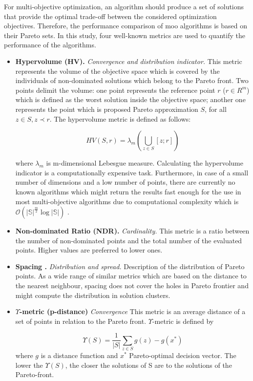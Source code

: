             For multi-objective optimization, an algorithm should produce a set of solutions that provide the optimal trade-off between the considered optimization objectives. Therefore, the performance comparison of \gls{moo} algorithms is based on their Pareto sets. In this study, four well-known metrics are used to quantify the performance of the algorithms.
            \begin{itemize}
                \item \textbf{Hypervolume (HV).}\cite{Zitzler2000ComparisonOM} \textit{Convergence and distribution indicator.}
                This metric represents the volume of the objective space which is covered by the individuals of non-dominated solutions which belong to the Pareto front. Two points delimit the volume: one point represents the reference point $r$ ($r \in R^m$) which is defined as the worst solution inside the objective space; another one represents the point which is proposed Pareto approximation $S$, for all $z \in S, z \prec r$. The hypervolume metric is defined as follows:

                    \[HV(S,r) = \lambda_m(\bigcup\limits_{z \in S} [z;r])\]

                where $\lambda_m$ is m-dimensional Lebesgue measure.    
                Calculating the hypervolume indicator is a computationally expensive task. Furthermore, in case of a small number of dimensions and a low number of points, there are currently no known algorithms which might return the results fast enough for the use in most multi-objective algorithms due to computational complexity which is 
                $\mathcal{O}(|\mathbb{S}|^{\frac{m}{2}}\log{|\mathbb{S}|}) $ \cite{BeumeFLPV09}.
                \item \textbf{Non-dominated Ratio (NDR).} \textit{Cardinality.} This metric is a ratio between the number of non-dominated points and the total number of the evaluated points.  Higher values are preferred to lower ones.
                \item \textbf{Spacing \cite{Schott1995FaultTD}.} \textit{Distribution and spread.} Description of the distribution of Pareto points. As a wide range of similar metrics which are based on the distance to the nearest neighbour, spacing does not cover the holes in Pareto frontier and might compute the distribution in solution clusters.
                \item \textbf{$\Upsilon$-metric (p-distance)}\cite{Martens13} \textit{Convergence} This metric is an average distance of a set of points in relation to the Pareto front. $\Upsilon$-metric is defined by

                    \[\Upsilon(S) = \frac{1}{|S|}\sum_{z\in S}g(z)-g(x^*)\]
                where $g$ is a distance function and $x^*$ Pareto-optimal decision vector.
                The lower the $\Upsilon (S)$, the closer the solutions of S are to the solutions of the Pareto-front. 
                
            \end{itemize}
 
